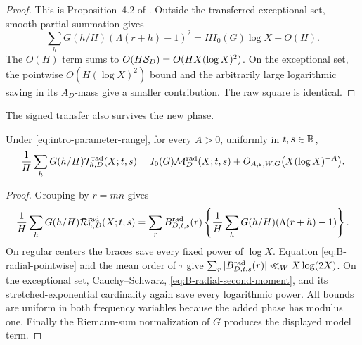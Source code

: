 \begin{proof}
This is Proposition~4.2 of \citet{WangTPC12}.  Outside the transferred
exceptional set, smooth
partial summation gives
\[
 \sum_hG(h/H)(\Lambda(r+h)-1)^2
 =HI_0(G)\log X+O(H).
\]
The $O(H)$ term sums to $O(H\mathcal S_D)=O(HX(\log X)^2)$.  On the exceptional
set, the pointwise $O(H(\log X)^2)$ bound and the arbitrarily large
logarithmic saving in its $A_D$-mass give a smaller contribution.  The
raw square is identical.
\end{proof}

The signed transfer also survives the new phase.

\begin{theorem}
\label{thm:radial-first-moment}
Under \eqref{eq:intro-parameter-range}, for every $A>0$, uniformly in
$t,s\in\mathbb R$,
\begin{equation}
 \frac1H\sum_hG(h/H)\mathcal T^{\mathrm{rad}}_{h,D}(X;t,s)
 =I_0(G)\mathcal M^{\mathrm{rad}}_D(X;t,s)
 +O_{A,\varepsilon,W,G}\bigl(X(\log X)^{-A}\bigr).
 \label{eq:radial-first-moment}
\end{equation}
\end{theorem}

\begin{proof}
Grouping by $r=mn$ gives
\[
 \frac1H\sum_hG(h/H)\mathcal R^{\mathrm{rad}}_{h,D}(X;t,s)
 =\sum_rB^{\mathrm{rad}}_{D,t,s}(r)
 \left\{\frac1H\sum_hG(h/H)(\Lambda(r+h)-1)\right\}.
\]
On regular centers the braces save every fixed power of $\log X$.
Equation \eqref{eq:B-radial-pointwise} and the mean order of $\tau$
give $\sum_r|B^{\mathrm{rad}}_{D,t,s}(r)|\ll_WX\log(2X)$.  On the exceptional
set, Cauchy--Schwarz, \eqref{eq:B-radial-second-moment}, and its
stretched-exponential cardinality again save every logarithmic power.
All bounds are uniform in both frequency variables because the added
phase has modulus one.  Finally the Riemann-sum normalization of $G$
produces the displayed model term.
\end{proof}
